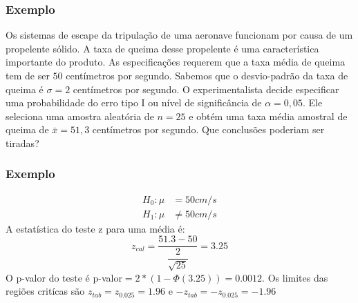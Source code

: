 \documentclass[14pt,aspectratio=1610]{beamer}
\newcommand{\bx}{\ensuremath{\bar{x}}}
\begin{document}
\begin{frame}{}
\frametitle{Exemplo}
\small
\begin{block}{}
\justifying
Os sistemas de escape da tripulação de uma aeronave funcionam por causa de um propelente sólido. A taxa de queima desse propelente é uma característica importante 
do produto. As especificações requerem que a taxa média de queima tem de ser $50$ centímetros por segundo. Sabemos que o desvio-padrão da taxa de queima é 
$\sigma = 2$ centímetros por segundo. O experimentalista decide especificar uma probabilidade do erro tipo I ou nível de significância de $\alpha = 0,05.$ Ele seleciona 
uma amostra aleatória de $n = 25$ e obtém uma taxa média amostral de queima de $\bx = 51,3$ centímetros por segundo. Que conclusões poderiam ser tiradas?
\end{block}
\end{frame}

\begin{frame}{}
\frametitle{Exemplo}
\small
\begin{block}{}
\justifying
\begin{align*}
H_{0}: \mu&=50 cm/s\\ 
H_{1}: \mu&\neq 50 cm/s
\end{align*}
A estatística do teste z para uma média é:
$$z_{cal}=\dfrac{51.3-50}{\dfrac{2}{\sqrt{25}}}=3.25$$
O p-valor do teste é p-valor$=2*(1-\Phi(3.25))=0.0012.$ Os limites das regiões critícas são $z_{tab}=z_{0.025}=1.96$ e $-z_{tab}=-z_{0.025}=-1.96$
\end{block}
\end{frame}
\end{document}
